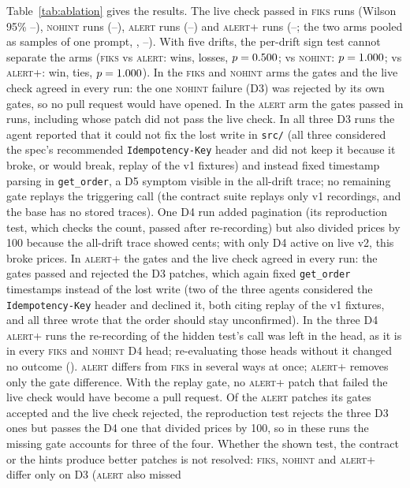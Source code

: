 \documentclass[10pt]{article}
\begin{document}
Table~\ref{tab:ablation} gives the results. The live check passed in \expLiveFiks{} \textsc{fiks} runs (Wilson 95\% \expLiveLoFiks--\expLiveHiFiks), \expLiveNohint{} \textsc{nohint} runs (\expLiveLoNohint--\expLiveHiNohint), \expLiveAlert{} \textsc{alert} runs (\expLiveLoAlert--\expLiveHiAlert) and \expLiveAlertplus{} \textsc{alert+} runs (\expLiveLoAlertplus--\expLiveHiAlertplus; the two arms pooled as samples of one prompt, \expLiveAlertPooled, \expLiveLoAlertPooled--\expLiveHiAlertPooled). With five drifts, the per-drift sign test cannot separate the arms (\textsc{fiks} vs \textsc{alert}: \expSignFiksVsAlertWins{} wins, \expSignFiksVsAlertLosses{} losses, $p=0.500$; vs \textsc{nohint}: $p=1.000$; vs \textsc{alert+}: \expSignFiksVsAlertplusWins{} win, \expSignFiksVsAlertplusTies{} ties, $p=1.000$). In the \textsc{fiks} and \textsc{nohint} arms the gates and the live check agreed in every run: the one \textsc{nohint} failure (D3) was rejected by its own gates, so no pull request would have opened. In the \textsc{alert} arm the gates passed in \expGatesAlert{} runs, including \expGatesPassLiveFailAlert{} whose patch did not pass the live check. In all three D3 runs the agent reported that it could not fix the lost write in \texttt{src/} (all three considered the spec's recommended \texttt{Idempotency-Key} header and did not keep it because it broke, or would break, replay of the v1 fixtures) and instead fixed timestamp parsing in \texttt{get\_order}, a D5 symptom visible in the all-drift trace; no remaining gate replays the triggering call (the contract suite replays only v1 recordings, and the base has no stored traces). One D4 run added pagination (its reproduction test, which checks the count, passed after re-recording) but also divided prices by 100 because the all-drift trace showed cents; with only D4 active on live v2, this broke prices. In \textsc{alert+} the gates and the live check agreed in every run: the gates passed \expGatesAlertplus{} and rejected the \expGatesFailLiveFailAlertplus{} D3 patches, which again fixed \texttt{get\_order} timestamps instead of the lost write (two of the three agents considered the \texttt{Idempotency-Key} header and declined it, both citing replay of the v1 fixtures, and all three wrote that the order should stay unconfirmed). In the three D4 \textsc{alert+} runs the re-recording of the hidden test's call was left in the head, as it is in every \textsc{fiks} and \textsc{nohint} D4 head; re-evaluating those heads without it changed no outcome (). \textsc{alert} differs from \textsc{fiks} in several ways at once; \textsc{alert+} removes only the gate difference. With the replay gate, no \textsc{alert+} patch that failed the live check would have become a pull request. Of the \expGatesPassLiveFailAlert{} \textsc{alert} patches its gates accepted and the live check rejected, the reproduction test rejects the three D3 ones but passes the D4 one that divided prices by 100, so in these runs the missing gate accounts for three of the four. Whether the shown test, the contract or the hints produce better patches is not resolved: \textsc{fiks}, \textsc{nohint} and \textsc{alert+} differ only on D3 (\textsc{alert} also missed 
\end{document}
